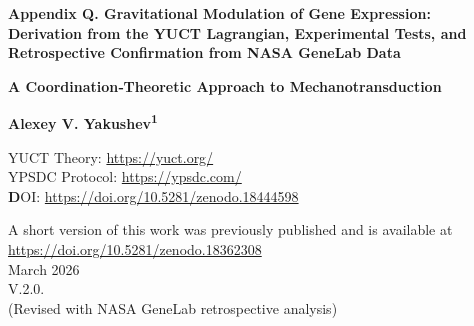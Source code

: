 \documentclass[12pt,a4paper]{article}
\theoremstyle{remark}
\begin{document}
	
	\begin{titlepage}
		\begin{center}
			\vspace*{1cm}
			
			\Huge\textbf{Appendix Q. Gravitational Modulation of Gene Expression: \\ Derivation from the YUCT Lagrangian, Experimental Tests, and Retrospective Confirmation from NASA GeneLab Data}
			
			\vspace{0.5cm}
			\Large\textbf{A Coordination‑Theoretic Approach to Mechanotransduction}
			
			\vspace{1.5cm}
			
			\Large\textbf{Alexey V. Yakushev\textsuperscript{1}}
			
	YUCT Theory: \url{https://yuct.org/}\\
YPSDC Protocol: \url{https://ypsdc.com/}\\


\vspace{2cm}
\textbf DOI: \url{https://doi.org/10.5281/zenodo.18444598}\\

\vspace{1cm}

\vspace{0cm}
\large 
A short version of this work was previously published and is available at\\ \url{https://doi.org/10.5281/zenodo.18362308}\\
\vspace{1cm}
March 2026 \\ \large V.2.0.
			\\ (Revised with NASA GeneLab retrospective analysis)
			
			\vspace{2cm}
			

\end{center}
\end{titlepage}
\end{document}
